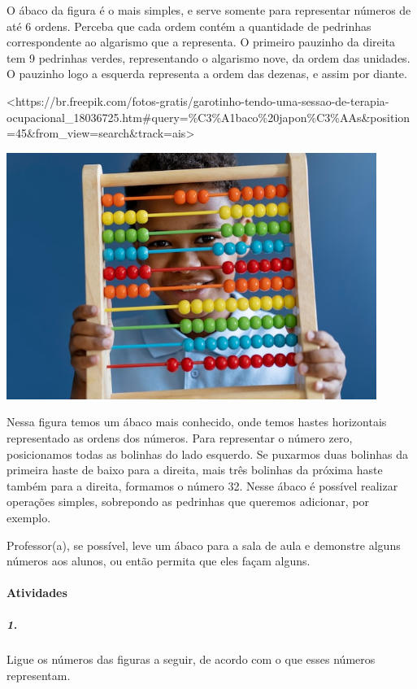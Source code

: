 O ábaco da figura é o mais simples, e serve somente para representar
números de até 6 ordens. Perceba que cada ordem contém a quantidade de
pedrinhas correspondente ao algarismo que a representa. O primeiro
pauzinho da direita tem 9 pedrinhas verdes, representando o algarismo
nove, da ordem das unidades. O pauzinho logo a esquerda representa a
ordem das dezenas, e assim por diante.

\textless{}https://br.freepik.com/fotos-gratis/garotinho-tendo-uma-sessao-de-terapia-ocupacional\_18036725.htm\#query=\%C3\%A1baco\%20japon\%C3\%AAs\&position=45\&from\_view=search\&track=ais\textgreater{}

\includegraphics[width=4.73800in,height=3.15625in]{media/image2.jpeg}

Nessa figura temos um ábaco mais conhecido, onde temos hastes
horizontais representado as ordens dos números. Para representar o
número zero, posicionamos todas as bolinhas do lado esquerdo. Se
puxarmos duas bolinhas da primeira haste de baixo para a direita, mais
três bolinhas da próxima haste também para a direita, formamos o número
32. Nesse ábaco é possível realizar operações simples, sobrepondo as
pedrinhas que queremos adicionar, por exemplo.

Professor(a), se possível, leve um ábaco para a sala de aula e demonstre
alguns números aos alunos, ou então permita que eles façam alguns.

\paragraph{Atividades }\label{atividades}

\subparagraph{1.}\label{section}

Ligue os números das figuras a seguir, de acordo com o que esses números
representam.

